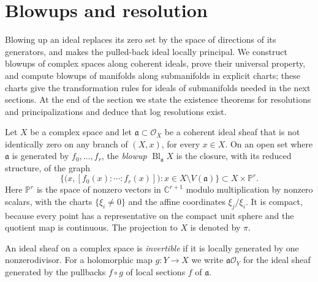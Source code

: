 \section{Blowups and resolution}\label{sec:analytic-blowups-resolution}

Blowing up an ideal replaces its zero set by the space of directions of its generators, and makes the pulled-back ideal locally principal. We construct blowups of complex spaces along coherent ideals, prove their universal property, and compute blowups of manifolds along submanifolds in explicit charts; these charts give the transformation rules for ideals of submanifolds needed in the next sections. At the end of the section we state the existence theorems for resolutions and principalizations and deduce that log resolutions exist.

\begin{definition}\label{def:analytic-blowup}
Let $X$ be a complex space and let $\mathfrak a\subset\mathcal O_X$ be a coherent ideal sheaf that is not identically zero on any branch of $(X,x)$, for every $x\in X$. On an open set where $\mathfrak a$ is generated by $f_0,\ldots,f_r$, the \emph{blowup} $\operatorname{Bl}_{\mathfrak a}X$ is the closure, with its reduced structure, of the graph
\[
 \bigl\{\bigl(x,[f_0(x):\cdots:f_r(x)]\bigr):x\in X\setminus V(\mathfrak a)\bigr\}
 \subset X\times\mathbb P^r.
\]
Here $\mathbb P^r$ is the space of nonzero vectors in $\mathbb C^{r+1}$ modulo multiplication by nonzero scalars, with the charts $\{\xi_i\neq0\}$ and the affine coordinates $\xi_j/\xi_i$. It is compact, because every point has a representative on the compact unit sphere and the quotient map is continuous. The projection to $X$ is denoted by $\pi$.
\end{definition}

An ideal sheaf on a complex space is \emph{invertible} if it is locally generated by one nonzerodivisor. For a holomorphic map $g\colon Y\to X$ we write $\mathfrak a\mathcal O_Y$ for the ideal sheaf generated by the pullbacks $f\circ g$ of local sections $f$ of $\mathfrak a$.

